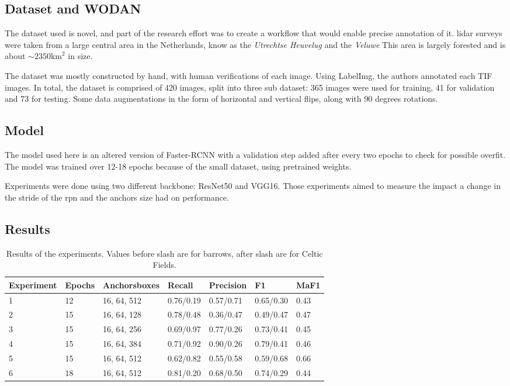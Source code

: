 \subsection{Dataset and WODAN}
The dataset used is novel, and part of the research effort was to create a workflow that would enable precise annotation of it. \gls{lidar} surveys were taken from a large central area in the Netherlands, know as the \textit{Utrechtse Heuvelug} and the \textit{Veluwe} This area is largely forested and is about $\sim 2350 \text{km}^2$ in size. 


The dataset was mostly constructed by hand, with human verifications of each image. Using LabelImg\cite{labelImg}, the authors annotated each TIF images. In total, the dataset is comprised of 420 images, split into three sub dataset: 365 images were used for training, 41 for validation and 73 for testing. Some data augmentations in the form of horizontal and vertical flips, along with 90 degrees rotations. 

\subsection{Model}
The model used here is an altered version of Faster-RCNN with a validation step added after every two epochs to check for possible \gls{overfit}.
The model was trained over 12-18 epochs because of the small dataset, using pretrained weights.

Experiments were done using two different backbone: ResNet50\cite{resNet} and VGG16\cite{vgg}. Those experiments aimed to measure the impact a change in the stride of the \gls{rpn} and the anchors size had on performance. 

\subsection{Results}

\begin{table}[h]
	\centering
	\begin{tabular}{lllllll}
		Experiment & Epochs & Anchorsboxes & Recall    & Precision & F1        & MaF1 \\\midrule
		1          & 12     & 16, 64, 512  & 0.76/0.19 & 0.57/0.71 & 0.65/0.30 & 0.43 \\
		2          & 15     & 16, 64, 128  & 0.78/0.48 & 0.36/0.47 & 0.49/0.47 & 0.47 \\
		3          & 15     & 16, 64, 256  & 0.69/0.97 & 0.77/0.26 & 0.73/0.41 & 0.45 \\
		4          & 15     & 16, 64, 384  & 0.71/0.92 & 0.90/0.26 & 0.79/0.41 & 0.46 \\
		5          & 15     & 16, 64, 512  & 0.62/0.82 & 0.55/0.58 & 0.59/0.68 & 0.66 \\
		6          & 18     & 16, 64, 512  & 0.81/0.20 & 0.68/0.50 & 0.74/0.29 & 0.44 \\\bottomrule
	\end{tabular}
	\caption{Results of the experiments. Values before slash are for barrows, after slash are for Celtic Fields.}
	\label{tab:learningLidarRes}
\end{table}

